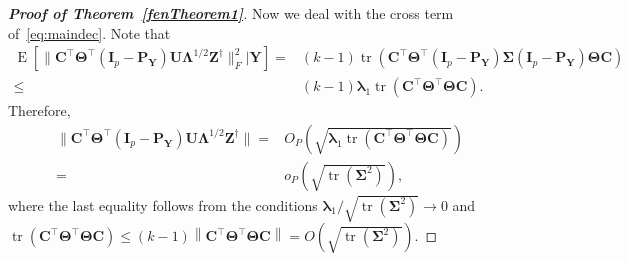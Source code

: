 \documentclass[10pt]{book}
\theoremstyle{definition}
\DeclareMathOperator{\mytr}{tr}
\DeclareMathOperator{\myE}{E}
\newcommand{\bZ}{\mathbf{Z}}
\newcommand{\bP}{\mathbf{P}}
\newcommand{\bY}{\mathbf{Y}}
\newcommand{\bC}{\mathbf{C}}
\newcommand{\bI}{\mathbf{I}}
\newcommand{\bU}{\mathbf{U}}
\newcommand{\bfsym}[1]{\ensuremath{\boldsymbol{#1}}}
\def\blambda {\bfsym {\lambda}}
\def\bLambda {\bfsym {\Lambda}}
\def\bSigma {\bfsym {\Sigma}}
\def\bTheta {\bfsym {\Theta}}
\begin{document}
\begin{proof}[\textbf{Proof of Theorem~\ref{fenTheorem1}}]
Now we deal with the cross term of~\eqref{eq:maindec}. Note that
$$
\begin{aligned}
    \myE [\|\bC^\top \bTheta^\top (\bI_p -\bP_{\bY})\bU\bLambda^{1/2}\bZ^{\dagger}\|_F^2|\bY]
    = &
    (k-1)\mytr\left(\bC^\top \bTheta^\top (\bI_p -\bP_{\bY})\bSigma (\bI_p -\bP_{\bY})\bTheta \bC\right)\\
    \leq &
    (k-1)\blambda_1
    \mytr\left(\bC^\top \bTheta^\top \bTheta \bC\right).
\end{aligned}
$$
Therefore,
\begin{equation}\label{bufenEq3}
    \begin{split}
\|\bC^\top \bTheta^\top (\bI_p -\bP_{\bY})\bU\bLambda^{1/2}\bZ^{\dagger}\|
=&O_P\left(
    \sqrt{
        \blambda_1
    \mytr\left(\bC^\top \bTheta^\top \bTheta \bC\right)
}
\right)
\\
=&o_P\left(\sqrt{\mytr(\bSigma^2)}\right),
    \end{split}
\end{equation}
where the last equality follows from the conditions $\blambda_1/\sqrt{\mytr(\bSigma^2)}\to 0$ and 
$
    \mytr\left(\bC^\top \bTheta^\top \bTheta \bC\right)
    \leq (k-1)
    \left\|\bC^\top \bTheta^\top \bTheta \bC\right\|=O(\sqrt{\mytr(\bSigma^2)})
    $.


\end{proof}
\end{document}
